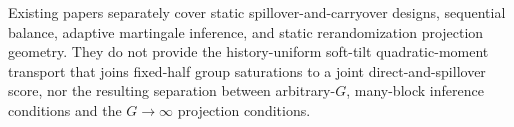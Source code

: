 Existing papers separately cover static spillover-and-carryover designs, sequential balance, adaptive martingale inference, and static rerandomization projection geometry.  They do not provide the history-uniform soft-tilt quadratic-moment transport that joins fixed-half group saturations to a joint direct-and-spillover score, nor the resulting separation between arbitrary-\(G\), many-block inference conditions and the \(G\to\infty\) projection conditions.